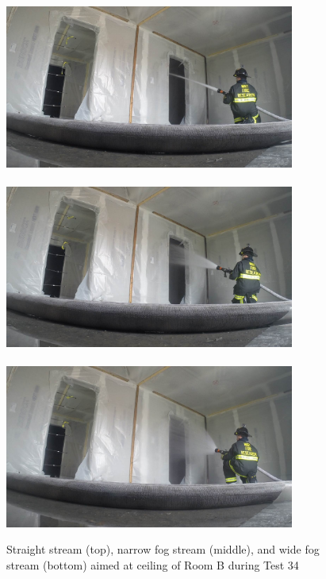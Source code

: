 \documentclass[12pt,oneside]{book}
\begin{document}
\begin{figure}[!ht]
\includegraphics[trim=23cm 6.5cm 4cm 6cm, clip=true, width=3.75in]{../Pictures/SS_Room_B_Test_34}
\\~\\
\includegraphics[trim=23cm 6.5cm 4cm 6cm, clip=true, width=3.75in]{../Pictures/NF_Room_B_Test_34}
\\~\\
\includegraphics[trim=23cm 6.5cm 4cm 6cm, clip=true, width=3.75in]{../Pictures/WF_Room_B_Test_34}
\caption[Straight Stream, Narrow Fog Stream, and Wide Fog Stream during Test 34]{Straight stream (top), narrow fog stream (middle), and wide fog stream (bottom) aimed at ceiling of Room B during Test 34}
\label{fig:test_34_pic}
\end{figure}
\FloatBarrier
\end{document}
